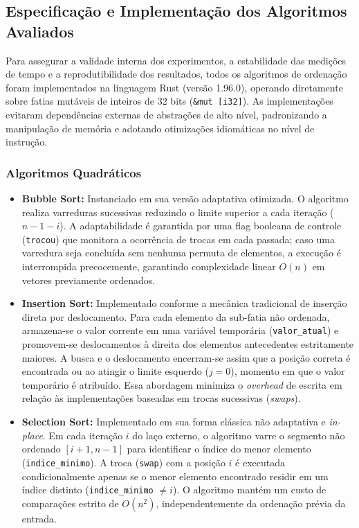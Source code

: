 \documentclass[portuguese]{sbc2025}%
\begin{document}
\subsection{Especificação e Implementação dos Algoritmos Avaliados}

Para assegurar a validade interna dos experimentos, a estabilidade das medições de tempo e a reprodutibilidade dos resultados, todos os algoritmos de ordenação foram implementados na linguagem Rust (versão 1.96.0), operando diretamente sobre fatias mutáveis de inteiros de 32 bits (\texttt{\&mut [i32]}). As implementações evitaram dependências externas de abstrações de alto nível, padronizando a manipulação de memória e adotando otimizações idiomáticas no nível de instrução.

\subsubsection{Algoritmos Quadráticos}

\begin{itemize}
    \item \textbf{Bubble Sort:} Instanciado em sua versão adaptativa otimizada. O algoritmo realiza varreduras sucessivas reduzindo o limite superior a cada iteração ($n - 1 - i$). A adaptabilidade é garantida por uma flag booleana de controle (\texttt{trocou}) que monitora a ocorrência de trocas em cada passada; caso uma varredura seja concluída sem nenhuma permuta de elementos, a execução é interrompida precocemente, garantindo complexidade linear $O(n)$ em vetores previamente ordenados.

    \item \textbf{Insertion Sort:} Implementado conforme a mecânica tradicional de inserção direta por deslocamento. Para cada elemento da sub-fatia não ordenada, armazena-se o valor corrente em uma variável temporária (\texttt{valor\_atual}) e promovem-se deslocamentos à direita dos elementos antecedentes estritamente maiores. A busca e o deslocamento encerram-se assim que a posição correta é encontrada ou ao atingir o limite esquerdo ($j = 0$), momento em que o valor temporário é atribuído. Essa abordagem minimiza o \emph{overhead} de escrita em relação às implementações baseadas em trocas sucessivas (\emph{swaps}).

    \item \textbf{Selection Sort:} Implementado em sua forma clássica não adaptativa e \emph{in-place}. Em cada iteração $i$ do laço externo, o algoritmo varre o segmento não ordenado $[i + 1, n - 1]$ para identificar o índice do menor elemento (\texttt{indice\_minimo}). A troca (\texttt{swap}) com a posição $i$ é executada condicionalmente apenas se o menor elemento encontrado residir em um índice distinto (\texttt{indice\_minimo} $\neq i$). O algoritmo mantém um custo de comparações estrito de $O(n^2)$, independentemente da ordenação prévia da entrada.
\end{itemize}
\end{document}
